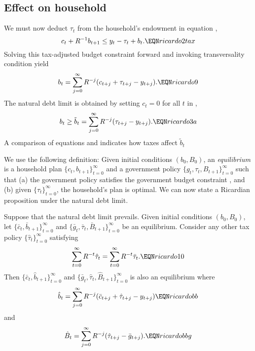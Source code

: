 \subsection{Effect on household}
We must now deduct $\tau_t$ from the household's endowment in equation
,
$$ c_t + R^{-1} b_{t+1} \leq y_t - \tau_t + b_t.  \EQN ricardo2tax$$
 Solving this tax-adjusted budget constraint forward
and invoking transversality condition  yield
$$ b_t = \sum_{j=0}^\infty R^{-j} (c_{t+j} + \tau_{t+j} - y_{t+j}).
 \EQN ricardo9$$
The natural debt limit is obtained by setting $c_t=0$ for all $t$
in ,
$$b_t \geq \tilde b_t = \sum_{j=0}^\infty R^{-j} (\tau_{t+j} - y_{t+j}).
    \EQN ricardo3a$$
A comparison of  equations  and  indicates how taxes affect
$\tilde b_t$



We use the following definition:
\medskip{} Given initial conditions $(b_0, B_0)$,
an {\it equilibrium} is
a household plan $\{c_t,   b_{t+1}\}_{t=0}^\infty$ and a government
policy $\{g_t, \tau_t, B_{t+1}\}_{t=0}^\infty$ such that (a) the government
policy satisfies the government budget    constraint , and
(b) given $\{\tau_t\}_{t=0}^\infty$, the household's  plan is optimal.
\medskip
  We can now state a Ricardian proposition
 under the natural debt limit.

\medskip{} Suppose that  the natural
debt limit prevails. Given initial conditions $(b_0, B_0)$,
let $\{\bar c_t, \bar b_{t+1}\}_{t=0}^\infty$ and
$\{\bar g_t, \bar \tau_t , \bar B_{t+1}\}_{t=0}^\infty$ be an equilibrium.
Consider any other tax policy $\{\hat \tau_t\}_{t=0}^\infty$ satisfying
$$ \sum_{t=0}^\infty R^{-t} \hat \tau_t =
\sum_{t=0}^\infty R^{-t} \bar \tau_t . \EQN ricardo10$$
Then  $\{\bar c_t, \hat b_{t+1}\}_{t=0}^\infty$ and $\{\bar g_t, \hat \tau_t,
\hat B_{t+1}\}_{t=0}^\infty$ is also an equilibrium where
$$ \hat b_t = \sum_{j=0}^\infty R^{-j} (\bar c_{t+j} +
\hat \tau_{t+j} - y_{t+j})                         \EQN ricardobb$$
and
$$ \hat B_t = \sum_{j=0}^\infty R^{-j}(\hat \tau_{t+j} -\bar g_{t+j}).
                                                    \EQN ricardobbg$$
\medskip

